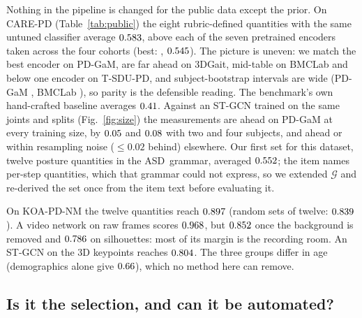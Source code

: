 \documentclass[runningheads]{llncs}
\newcommand{\asd}{ASD}
\begin{document}
Nothing in the pipeline is changed for the public data except the prior. On CARE-PD
(Table~\ref{tab:public}) the eight rubric-defined quantities with the same untuned
classifier average $0.583$, above each of the seven pretrained encoders taken across the
four cohorts (best: \pdBestEncName, $0.545$). The picture is uneven: we match the best encoder on
PD-GaM, are far ahead on 3DGait, mid-table on BMCLab and below one encoder on T-SDU-PD, and
subject-bootstrap intervals are wide (PD-GaM \pdGamCi, BMCLab \pdBmcCi), so parity is the
defensible reading. The benchmark's own hand-crafted baseline averages $0.41$. Against an ST-GCN trained on
the same joints and splits (Fig.~\ref{fig:size}) the measurements are ahead on PD-GaM at
every training size, by $0.05$ and $0.08$ with two and four subjects, and
ahead or within resampling noise ($\le0.02$ behind) elsewhere. Our first set for this dataset, twelve posture quantities in the \asd\ grammar, averaged
$0.552$; the item names per-step quantities, which that grammar could not express, so we
extended $\mathcal{G}$ and re-derived the set once from the item text before evaluating it.

On KOA-PD-NM the twelve quantities reach $0.897$ (random sets of twelve: $0.839$). A video
network on raw frames scores $0.968$, but $0.852$ once the background is removed and
$0.786$ on silhouettes: most of its margin is the recording room. An ST-GCN on the 3D
keypoints reaches $0.804$. The three groups differ in age (demographics alone give
$0.66$), which no method here can remove.

\subsection{Is it the selection, and can it be automated?}
\end{document}
